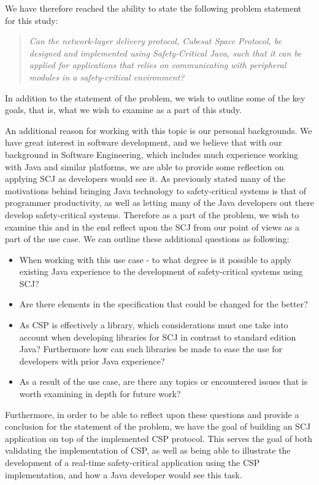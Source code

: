 We have therefore reached the ability to state the following problem statement for this study:
\begin{quotation}
	\textit{Can the network-layer delivery protocol, Cubesat Space Protocol, be designed and implemented using Safety-Critical Java, such that it can be applied for applications that relies on communicating with peripheral modules in a safety-critical environment?}
\end{quotation}
In addition to the statement of the problem, we wish to outline some of the key goals, that is, what we wish to examine as a part of this study.

An additional reason for working with this topic is our personal backgrounds. We have great interest in software development, and we believe that with our background in Software Engineering, which includes much experience working with Java and similar platforms, we are able to provide some reflection on applying SCJ as developers would see it. As previously stated many of the motivations behind bringing Java technology to safety-critical systems is that of programmer productivity, as well as letting many of the Java developers out there develop safety-critical systems. Therefore as a part of the problem, we wish to examine this and in the end reflect upon the SCJ from our point of views as a part of the use case. We can outline these additional questions as following:
\begin{itemize}
	\item When working with this use case - to what degree is it possible to apply existing Java experience to the development of safety-critical systems using SCJ?
	\item Are there elements in the specification that could be changed for the better?
	\item As CSP is effectively a library, which considerations must one take into account when developing libraries for SCJ in contrast to standard edition Java? Furthermore how can such libraries be made to ease the use for developers with prior Java experience?
	\item As a result of the use case, are there any topics or encountered issues that is worth examining in depth for future work?
\end{itemize}

Furthermore, in order to be able to reflect upon these questions and provide a conclusion for the statement of the problem, we have the goal of building an SCJ application on top of the implemented CSP protocol. This serves the goal of both 
validating the implementation of CSP, as well as being able to illustrate the development of a real-time safety-critical application using the CSP implementation, and how a Java developer would see this task.




